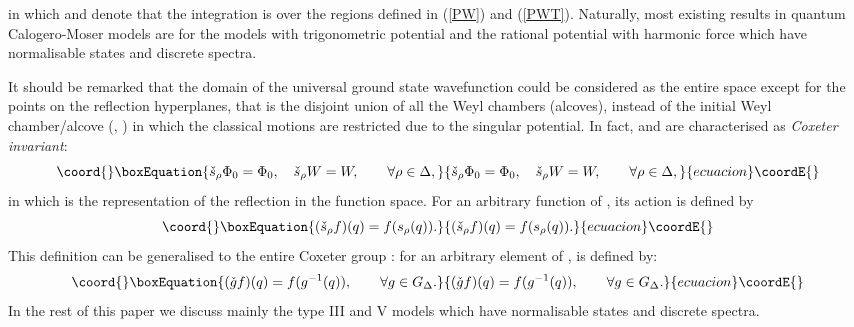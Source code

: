\documentclass[a4paper,12pt]{article}
\begin{document}
in which \coordHE{} and \coordHE{} denote that the integration is over the regions
defined in (\ref{PW}) and (\ref{PWT}).
Naturally,  most existing results in quantum Calogero-Moser models are
for the models with trigonometric potential and the
rational potential with harmonic force which have  normalisable states
and discrete spectra.

It should be remarked that the domain of the universal
ground state wavefunction
\coordHE{} could be considered as the  entire \coordHE{} space
except for the points on the reflection hyperplanes,
that is the disjoint union of all the Weyl chambers (alcoves),
instead of
the initial Weyl  chamber/alcove (\coordHE{}, \coordHE{}) in which the
classical motions  are restricted due to the singular potential. In
fact,
\coordHE{} and \coordHE{} are characterised as {\em Coxeter invariant\/}:
\begin{equation}\coord{}\boxEquation{
   \check{s}_{\rho}\Phi_0=\Phi_0,\quad \check{s}_{\rho}W
   =W,\qquad \forall\rho\in\Delta,
   \label{Coxinv}
}{
   \check{s}_{\rho}\Phi_0=\Phi_0,\quad \check{s}_{\rho}W
   =W,\qquad \forall\rho\in\Delta,
   }{ecuacion}\coordE{}\end{equation}
in which   \coordHE{} is the representation of the reflection
in the function space. For an arbitrary function \coordHE{} of \coordHE{},
its action is defined by
\begin{equation}\coord{}\boxEquation{
   (\check{s}_{\rho}f)(q)=f(s_{\rho}(q)).
   \label{defcheck}
}{
   (\check{s}_{\rho}f)(q)=f(s_{\rho}(q)).
   }{ecuacion}\coordE{}\end{equation}
This definition can be generalised to the entire Coxeter group
\coordHE{}:
for an arbitrary element \coordHE{} of \coordHE{}, \coordHE{} is defined
by:
\begin{equation}\coord{}\boxEquation{
   (\check{g}f)(q)=f(g^{-1}(q)),\qquad \forall g\in G_{\Delta}.
}{
   (\check{g}f)(q)=f(g^{-1}(q)),\qquad \forall g\in G_{\Delta}.
}{ecuacion}\coordE{}\end{equation}
In the rest of this paper we discuss mainly  the type III and V models
 which have  normalisable states
and discrete spectra.
\end{document}
